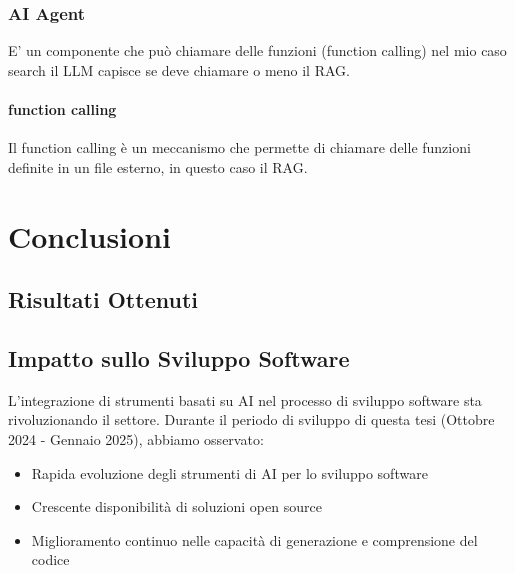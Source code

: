 \documentclass[12pt,a4paper,openright,twoside]{book}
\begin{document}
\subsection{AI Agent}
E' un componente che può chiamare delle funzioni (function calling) nel mio caso search
il LLM capisce se deve chiamare o meno il RAG.
\subsubsection{function calling}
Il function calling è un meccanismo che permette di chiamare delle funzioni definite in un file esterno, in questo caso il RAG.


\chapter{Conclusioni}

\section{Risultati Ottenuti}

\section{Impatto sullo Sviluppo Software}
L'integrazione di strumenti basati su AI nel processo di sviluppo software sta rivoluzionando il settore. Durante il periodo di sviluppo di questa tesi (Ottobre 2024 - Gennaio 2025), abbiamo osservato:
\begin{itemize}
    \item Rapida evoluzione degli strumenti di AI per lo sviluppo software
    \item Crescente disponibilità di soluzioni open source
    \item Miglioramento continuo nelle capacità di generazione e comprensione del codice
\end{itemize}
\end{document}
